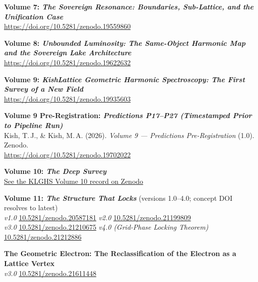 \documentclass[12pt,oneside]{book}
\begin{document}
\vspace{1em}
\noindent\textbf{Volume 7: \emph{The Sovereign Resonance: Boundaries, Sub-Lattice, and the Unification Case}}\\
\href{https://doi.org/10.5281/zenodo.19559860}{https://doi.org/10.5281/zenodo.19559860}

\vspace{1em}
\noindent\textbf{Volume 8: \emph{Unbounded Luminosity: The Same-Object Harmonic Map and the Sovereign Lake Architecture}}\\
\href{https://doi.org/10.5281/zenodo.19622632}{https://doi.org/10.5281/zenodo.19622632}

\vspace{1em}
\noindent\textbf{Volume 9: \emph{KishLattice Geometric Harmonic Spectroscopy: The First Survey of a New Field}}\\
\href{https://doi.org/10.5281/zenodo.19935603}{https://doi.org/10.5281/zenodo.19935603}

\vspace{1em}
\noindent\textbf{Volume 9 Pre-Registration: \emph{Predictions P17--P27 (Timestamped Prior to Pipeline Run)}}\\
Kish, T.\,J., \& Kish, M.\,A. (2026). \textit{Volume 9 --- Predictions Pre-Registration} (1.0). Zenodo.\\
\href{https://doi.org/10.5281/zenodo.19702022}{https://doi.org/10.5281/zenodo.19702022}

\vspace{1em}
\noindent\textbf{Volume 10: \emph{The Deep Survey}}\\
\href{https://doi.org/10.5281/zenodo.20587181}{See the KLGHS Volume 10 record on Zenodo}

\vspace{1em}
\noindent\textbf{Volume 11: \emph{The Structure That Locks}} (versions 1.0--4.0; concept DOI resolves to latest)\\
\emph{v1.0} \href{https://doi.org/10.5281/zenodo.20587181}{10.5281/zenodo.20587181} \quad
\emph{v2.0} \href{https://doi.org/10.5281/zenodo.21199809}{10.5281/zenodo.21199809}\\
\emph{v3.0} \href{https://doi.org/10.5281/zenodo.21210675}{10.5281/zenodo.21210675} \quad
\emph{v4.0 (Grid-Phase Locking Theorem)} \href{https://doi.org/10.5281/zenodo.21212886}{10.5281/zenodo.21212886}

\vspace{1em}
\noindent\textbf{The Geometric Electron: The Reclassification of the Electron as a Lattice Vertex}\\
\emph{v3.0} \href{https://doi.org/10.5281/zenodo.21611448}{10.5281/zenodo.21611448}
\end{document}
